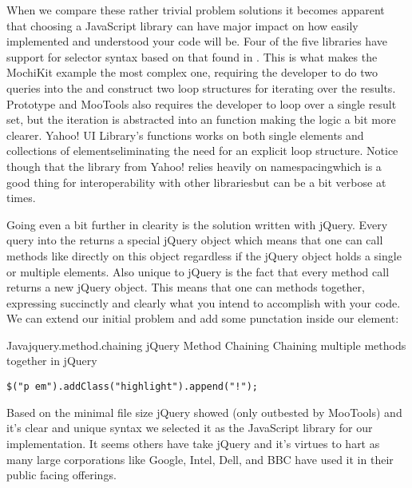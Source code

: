 When we compare these rather trivial problem solutions it becomes apparent
that choosing a JavaScript library can have major impact on how easily
implemented and understood your code will be. Four of the five libraries
have support for selector syntax based on
that found in%
.
This is what makes the MochiKit example the most complex one, requiring the
developer to do two queries into the  and construct two
loop structures for iterating over the results.
Prototype and MooTools also requires the developer to loop over a single
result set, but the iteration is abstracted into an  function
making the logic a bit more clearer. Yahoo! UI Library's  functions
works on both single elements and collections of elements\dash{}eliminating
the need for an explicit loop structure. Notice though that the library from
Yahoo! relies heavily on namespacing\dash{}which is a good thing for
interoperability with other libraries\dash{}but can be a bit verbose at times.

Going even a bit further in clearity is the solution written with jQuery.
Every query into the  returns a special jQuery object which means
that one can call methods like  directly on this object
regardless if the jQuery object holds a single or multiple elements.
Also unique to jQuery is the fact that every method call returns a new jQuery
object. This means that one can  methods together, expressing
succinctly and clearly what you intend to accomplish with your code. We can
extend our initial problem and add some punctation inside our 
element:

\begin{scode}{Java}{jquery.method.chaining}{%
  jQuery Method Chaining}{%
  Chaining multiple methods together in jQuery}
\begin{lstlisting}
$("p em").addClass("highlight").append("!");
\end{lstlisting}
\end{scode}

Based on the minimal file size jQuery showed (only outbested by MooTools) and
it's clear and unique syntax we selected it as the JavaScript library for our
implementation. It seems others have take jQuery and it's virtues to hart as
many large corporations like Google, Intel, Dell, and BBC have used it in
their public facing offerings.%

